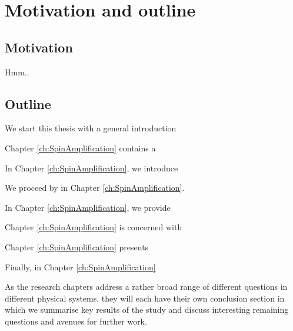 \chapter{Motivation and outline} 
\label{ch:Motivation}

\section{Motivation}

Hmm.. 

\section{Outline}

We start this thesis with a general introduction 

Chapter \ref{ch:SpinAmplification} contains a 

In Chapter \ref{ch:SpinAmplification}, we introduce 

We proceed by  in Chapter \ref{ch:SpinAmplification}. 

In Chapter \ref{ch:SpinAmplification}, we provide 

Chapter \ref{ch:SpinAmplification} is concerned with 

Chapter \ref{ch:SpinAmplification} presents 

Finally, in Chapter \ref{ch:SpinAmplification} 

As the research chapters address a rather broad range of different questions in different physical systems, they will each have their own conclusion section in which we summarise key results of the study and discuss interesting remaining questions and avenues for further work.


